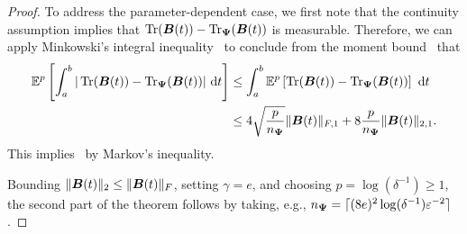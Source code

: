 \begin{proof}

    To address the parameter-dependent case, we first note that the continuity assumption implies that $\operatorname{Tr}(\boldsymbol{B}(t)) - \operatorname{Tr}_{\boldsymbol{\Psi}}(\boldsymbol{B}(t))$ is measurable. Therefore, we can apply Minkowski's integral inequality~\cite[Theorem 202]{hardy-1952-inequalities} to conclude from the moment bound~ that
    \begin{align*}
        \mathbb{E}^{p}\left[ \int_{a}^{b} |\operatorname{Tr}(\boldsymbol{B}(t)) - \operatorname{Tr}_{\boldsymbol{\Psi}}(\boldsymbol{B}(t))|~\mathrm{d}t  \right]
        &\leq \int_{a}^{b} \mathbb{E}^{p}\left[ \operatorname{Tr}(\boldsymbol{B}(t)) - \operatorname{Tr}_{\boldsymbol{\Psi}}(\boldsymbol{B}(t)) \right]~\mathrm{d}t \notag \\
        &\leq 4 \sqrt{\frac{p}{n_{\boldsymbol{\Psi}}}} \lVert \boldsymbol{B}(t) \rVert_{F,1} + 8 \frac{p}{n_{\boldsymbol{\Psi}}} \lVert \boldsymbol{B}(t) \rVert_{2,1}.
    \end{align*}
    This implies~ by Markov's inequality.

    Bounding $\lVert \boldsymbol{B}(t) \rVert _2 \leq \lVert \boldsymbol{B}(t) \rVert _F$, setting $\gamma = e$, and choosing $p = \log(\delta^{-1}) \geq 1$, the second part of the theorem follows by taking,  e.g., $n_{\boldsymbol{\Psi}} = \lceil (8 e)^2 \log(\delta^{-1}) \varepsilon^{-2} \rceil$.
\end{proof}
